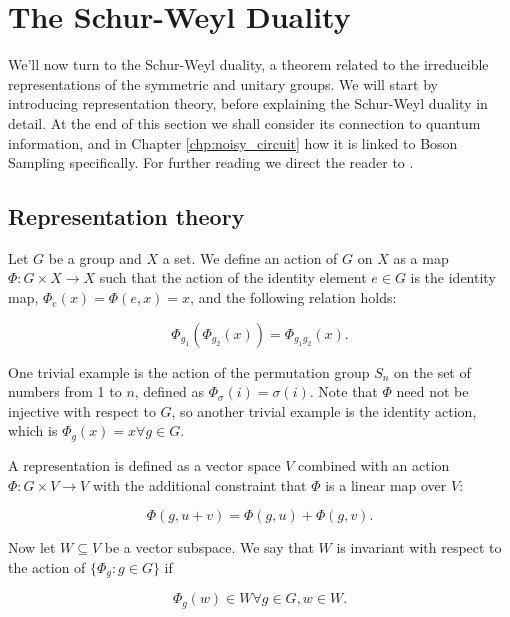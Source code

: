 \section{The Schur-Weyl Duality}
\label{sec:sw-duality}

We'll now turn to the Schur-Weyl duality, a theorem related to the irreducible representations of the symmetric and unitary groups. We will start by introducing representation theory, before explaining the Schur-Weyl duality in detail. At the end of this section we shall consider its connection to quantum information, and in Chapter \ref{chp:noisy_circuit} how it is linked to Boson Sampling specifically. For further reading we direct the reader to \cite{fulton2004, harrow2005}.

\subsection{Representation theory}

Let $G$ be a group and $X$ a set. We define an action of $G$ on $X$ as a map $\Phi\colon G\times X \rightarrow X$ such that the action of the identity element $e\in G$ is the identity map, $\Phi_e(x) = \Phi(e, x) = x$, and the following relation holds:

\begin{equation}
\Phi_{g_1}(\Phi_{g_2}(x)) = \Phi_{g_1g_2}(x).
\end{equation}

One trivial example is the action of the permutation group $S_n$ on the set of numbers from 1 to $n$, defined as $\Phi_\sigma(i) = \sigma(i)$. Note that $\Phi$ need not be injective with respect to $G$, so another trivial example is the identity action, which is $\Phi_g(x) = x \forall g \in G$.

A representation is defined as a vector space $V$ combined with an action $\Phi: G \times V \rightarrow V$ with the additional constraint that $\Phi$ is a linear map over $V$:

\begin{equation}
\Phi(g, u+v) = \Phi(g, u) + \Phi(g, v).
\end{equation}

Now let $W \subseteq V$ be a vector subspace. We say that $W$ is invariant with respect to the action of $\{\Phi_g\colon g\in G\}$ if

\begin{equation}
\Phi_g(w) \in W \forall g \in G, w \in W.
\end{equation}

